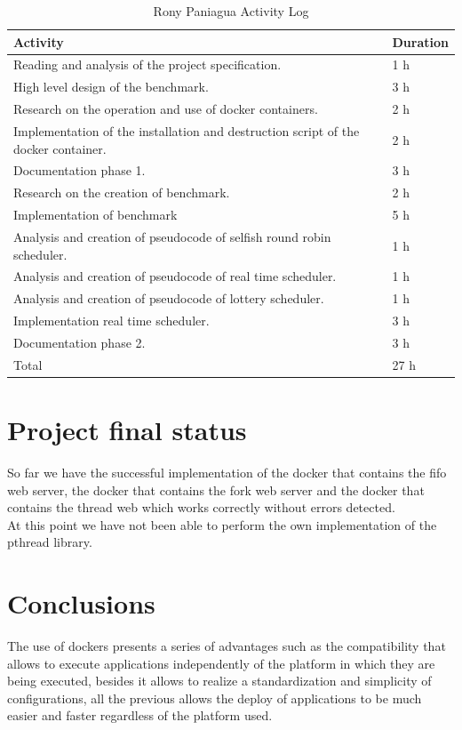 \documentclass{article}
\begin{document}
\begin{table}[H]
\centering
\caption{Rony Paniagua Activity Log}
\begin{tabular}{|p{7cm}|p{7cm}|}
\hline
\textbf{Activity} & \textbf{Duration} \\ \hline
Reading and analysis of the project specification. & 1 h \\ \hline
High level design of the benchmark. & 3 h\\ \hline
Research on the operation and use of docker containers. & 2 h\\ \hline
Implementation of the installation and destruction script of the docker container. & 2 h\\ \hline
Documentation phase 1. & 3 h\\ \hline
Research on the creation of benchmark. & 2 h\\ \hline
Implementation of benchmark & 5 h\\ \hline
Analysis and creation of pseudocode of selfish round robin scheduler. & 1 h\\ \hline
Analysis and creation of pseudocode of real time scheduler. & 1 h\\ \hline
Analysis and creation of pseudocode of lottery scheduler. & 1 h\\ \hline
Implementation real time scheduler. & 3 h\\ \hline
Documentation phase 2. & 3 h\\ \hline
Total & 27 h\\ \hline
\end{tabular}
\end{table}

\section{Project final status}
So far we have the successful implementation of the docker that contains the fifo web server, the docker that contains the fork web server and the docker that contains the thread web  which works correctly without errors detected.
\\At this point we have not been able to perform the own implementation of the pthread library.
\section{Conclusions}
The use of dockers presents a series of advantages such as the compatibility that allows to execute applications independently of the platform in which they are being executed, besides it allows to realize a standardization and simplicity of configurations, all the previous allows the deploy of applications to be much easier and faster regardless of the platform used.
\end{document}
